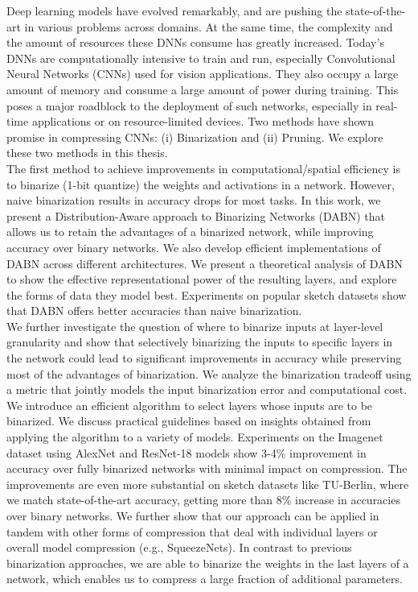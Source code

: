 \noindent Deep learning models have evolved remarkably, and are pushing the state-of-the-art in various problems across domains. At the same time, the complexity and the amount of resources these DNNs consume has greatly increased. Today's DNNs are computationally intensive to train and run, especially Convolutional Neural Networks (CNNs) used for vision applications. They also occupy a large amount of memory and consume a large amount of power during training. This poses a major roadblock to the deployment of such networks, especially in real-time applications or on resource-limited devices. Two methods have shown promise in compressing CNNs: (i) Binarization and (ii) Pruning. We explore these two methods in this thesis.\\

\noindent The first method to achieve improvements in computational/spatial efficiency is to binarize (1-bit quantize) the weights and activations in a network. However, naive binarization results in accuracy drops for most tasks. In this work, we present a Distribution-Aware approach to Binarizing Networks (DABN) that allows us to retain the advantages of a binarized network, while improving accuracy over binary networks. We also develop efficient implementations of DABN across different architectures. We present a theoretical analysis of DABN to show the effective representational power of the resulting layers, and explore the forms of data they model best. Experiments on popular sketch datasets show that DABN offers better accuracies than naive binarization. \\

\noindent We further investigate the question of where to binarize inputs at layer-level granularity and show that selectively binarizing the inputs to specific layers in the network could lead to significant improvements in accuracy while preserving most of the advantages of binarization. We analyze the binarization tradeoff using a metric that jointly models the input binarization error and computational cost. We introduce an efficient algorithm to select layers whose inputs are to be binarized. We discuss practical guidelines based on insights obtained from applying the algorithm to a variety of models. Experiments on the Imagenet dataset using AlexNet and ResNet-18 models show 3-4\% improvement in accuracy over fully binarized networks with minimal impact on compression. The improvements are even more substantial on sketch datasets like TU-Berlin, where we match state-of-the-art accuracy, getting more than 8\% increase in accuracies over binary networks. We further show that our approach can be applied in tandem with other forms of compression that deal with individual layers or overall model compression (e.g., SqueezeNets). In contrast to previous binarization approaches, we are able to binarize the weights in the last layers of a network, which enables us to compress a large fraction of additional parameters. \\

